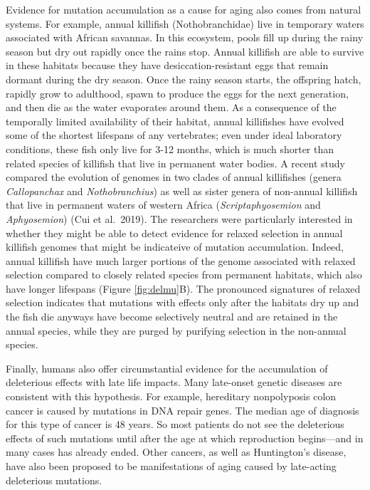 \documentclass[
]{book}
\begin{document}
Evidence for mutation accumulation as a cause for aging also comes from natural systems. For example, annual killifish (Nothobranchidae) live in temporary waters associated with African savannas. In this ecosystem, pools fill up during the rainy season but dry out rapidly once the rains stop. Annual killifish are able to survive in these habitats because they have desiccation-resistant eggs that remain dormant during the dry season. Once the rainy season starts, the offspring hatch, rapidly grow to adulthood, spawn to produce the eggs for the next generation, and then die as the water evaporates around them. As a consequence of the temporally limited availability of their habitat, annual killifishes have evolved some of the shortest lifespans of any vertebrates; even under ideal laboratory conditions, these fish only live for 3-12 months, which is much shorter than related species of killifish that live in permanent water bodies. A recent study compared the evolution of genomes in two clades of annual killifishes (genera \emph{Callopanchax} and \emph{Nothobranchius}) as well as sister genera of non-annual killifish that live in permanent waters of western Africa (\emph{Scriptaphyosemion} and \emph{Aphyosemion}) (Cui et al.~2019). The researchers were particularly interested in whether they might be able to detect evidence for relaxed selection in annual killifish genomes that might be indicateive of mutation accumulation. Indeed, annual killifish have much larger portions of the genome associated with relaxed selection compared to closely related species from permanent habitats, which also have longer lifespans (Figure \ref{fig:delmu}B). The pronounced signatures of relaxed selection indicates that mutations with effects only after the habitats dry up and the fish die anyways have become selectively neutral and are retained in the annual species, while they are purged by purifying selection in the non-annual species.

Finally, humans also offer circumstantial evidence for the accumulation of deleterious effects with late life impacts. Many late-onset genetic diseases are consistent with this hypothesis. For example, hereditary nonpolyposis colon cancer is caused by mutations in DNA repair genes. The median age of diagnosis for this type of cancer is 48 years. So most patients do not see the deleterious effects of such mutations until after the age at which reproduction begins---and in many cases has already ended. Other cancers, as well as Huntington's disease, have also been proposed to be manifestations of aging caused by late-acting deleterious mutations.
\end{document}
